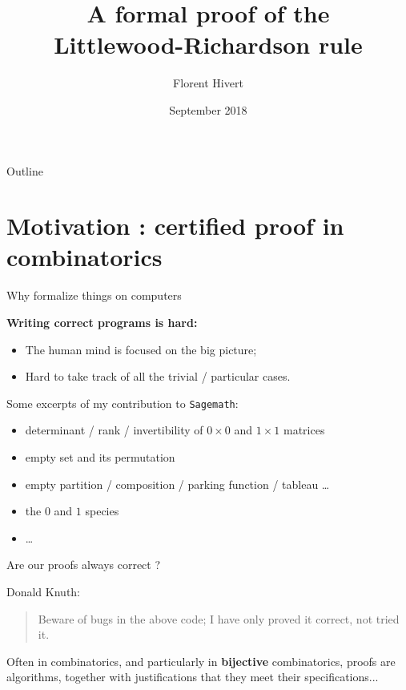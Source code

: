 \documentclass[compress,11pt]{beamer}
\title{\bf\LARGE A formal proof of the \\
Littlewood-Richardson rule\\[5mm]}
\author{Florent Hivert}
\institute[LRI]{
  LRI / Université Paris Sud 11 / CNRS}
\date[September 2018]{September 2018}
\begin{document}
\frame{\titlepage}

\begin{frame}{Outline}
  \tableofcontents
\end{frame}

\section{Motivation : certified proof in combinatorics}
\begin{frame}{Why formalize things on computers}

  \begin{center}
    \textbf{\LARGE Writing correct programs is hard:}
  \end{center}
\medskip

\begin{itemize}
\item The human mind is focused on the big picture;
\item Hard to take track of all the trivial / particular cases.
\end{itemize}
\bigskip\pause

Some excerpts of my contribution to \texttt{Sagemath}:
\begin{itemize}
\item determinant / rank / invertibility of $0\times0$ and $1\times1$ matrices
\item empty set and its permutation
\item empty partition / composition / parking function / tableau \dots
\item the $0$ and $1$ species
\item \dots
\end{itemize}
\bigskip\pause

\end{frame}

\begin{frame}{Are our proofs always correct ?}

Donald Knuth:
\begin{quote}\large
  Beware of bugs in the above code; I have only proved it correct, not tried it.
\end{quote}
\bigskip\pause

Often in combinatorics, and particularly in \textbf{bijective} combinatorics,
proofs are algorithms, together with justifications that they meet their
specifications...
\end{frame}
\end{document}
